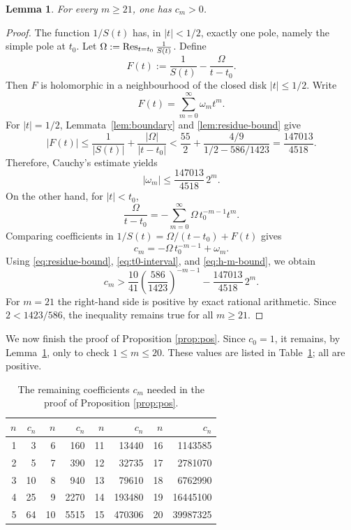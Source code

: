 \documentclass[11pt,reqno]{amsart}
\theoremstyle{plain}
\newtheorem{lemma}[theorem]{Lemma}
\theoremstyle{remark}
\theoremstyle{definition}
\numberwithin{equation}{section}
\def\func#1{\mathop{\rm #1}}%
\newcommand{\hilfsftn}{F}
\newcommand{\residuum}{\Omega }
\begin{document}
\begin{lemma}\label{lem:large-coefficients}
For every $m\geq 21
$, one has $c_m>0$.
\end{lemma}

\begin{proof}
The function $1/S(t)$ has, in $|t|<1/2$, exactly one pole, namely the simple pole
at $t_0$. Let
$\residuum
:=\func{Res}_{t=t_0}\frac1{S(t)}$.
Define
\[
        \hilfsftn (t):=\frac1{S(t)}-\frac{\residuum
        }{t-t_0}.
\]
Then $\hilfsftn $ is holomorphic in a neighbourhood of the closed disk $|t|\leq 1/2$.
Write
\[
        \hilfsftn (t)=\sum_{m=0}^{\infty}\omega _m t^m.
\]
For $|t|=1/2$, Lemmata~\ref{lem:boundary} and \ref{lem:residue-bound} give
\[
 |\hilfsftn (t)|\leq \frac1{|S(t)|}+\frac{|\residuum|}{|t-t_0|}
 <\frac{55}{2}
+\frac{4/9}{1/2-586/1423}
 =\frac{147013
}{4518
}.
\]
Therefore, Cauchy's estimate
yields
\begin{equation}\label{eq:h-m-bound}
        |\omega _m|\leq \frac{147013
}{4518
}\,2^m.
\end{equation}
On the other hand, for $|t|<t_0$,
\[
        \frac{\residuum}{t-t_0}
        =-\sum_{m=0}^{\infty}\residuum\,t_0^{-m-1}t^m.
\]
Comparing coefficients in $1/S(t)=\residuum/(t-t_0)+\hilfsftn (t)$ gives
\begin{equation*}\label{eq:coefficient-decomposition}
        c_m=-\residuum\,t_0^{-m-1}+\omega _m.
\end{equation*}
Using \eqref{eq:residue-bound}, \eqref{eq:t0-interval}, and
\eqref{eq:h-m-bound}, we obtain
\[
        c_m>\frac{10}{41}\left(\frac{586}{1423}\right)^{-m-1}
        -\frac{147013
}{4518
}\,2^m .
\]
For $m=21
$ the right-hand side is positive by exact rational arithmetic. Since
$2<
1423/586
$, the inequality remains true for all $m\geq 21
$.
\end{proof}

We now finish the proof of %
Proposition \ref{prop:pos}. Since $c_0=1$, it remains,
by Lemma~\ref{lem:large-coefficients}, only to check $1\leq m\leq 20
$. These
values are listed in Table~\ref{tab:small-c}; all are positive.

\begin{table}[H]
\centering
\small
\setlength{\tabcolsep}{5pt}
\renewcommand{\arraystretch}{1.08}
\begin{tabular}{@{}rr|rr|rr|rr@{}}
\toprule
$n$ & $c_n$ & $n$ & $c_n$ & $n$ & $c_n$ & $n$ & $c_n$ \\
\midrule
1 & 3    & 6 & 160  & 11 & 13440  & 16 & 1143585 \\
2 & 5    & 7 & 390  & 12 & 32735  & 17 & 2781070 \\
3 & 10   & 8 & 940  & 13 & 79610  & 18 & 6762990 \\
4 & 25   & 9 & 2270 & 14 & 193480 & 19 & 16445100 \\
5 & 64   & 10 & 5515   & 15 & 470306 &20&39987325\\
\bottomrule
\end{tabular}
\caption{The remaining coefficients $c_m$ needed in the proof of Proposition \ref{prop:pos}.}
\label{tab:small-c}
\end{table}
\end{document}
